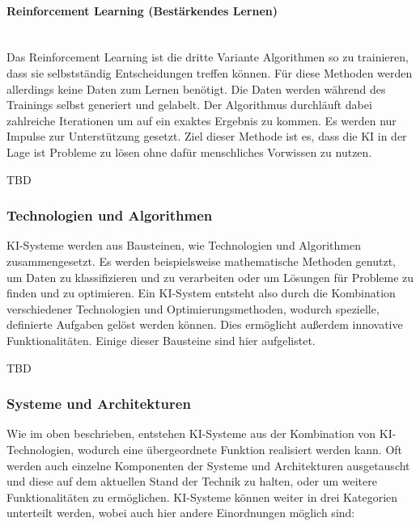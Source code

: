 \documentclass[a4paper,12pt, german]{report}
\begin{document}
\paragraph{Reinforcement Learning (Bestärkendes Lernen)} $ $ \\ Das Reinforcement Learning ist die dritte Variante Algorithmen so zu trainieren, dass sie selbstständig Entscheidungen treffen können. Für diese Methoden werden allerdings keine Daten zum Lernen benötigt. Die Daten werden während des Trainings selbst generiert und gelabelt. Der Algorithmus durchläuft dabei zahlreiche Iterationen um auf ein exaktes Ergebnis zu kommen. Es werden nur Impulse zur Unterstützung gesetzt. Ziel dieser Methode ist es, dass die KI in der Lage ist Probleme zu lösen ohne dafür menschliches Vorwissen zu nutzen.

TBD





\subsubsection{Technologien und Algorithmen}
KI-Systeme werden aus Bausteinen, wie Technologien und Algorithmen zusammengesetzt. Es werden beispielsweise mathematische Methoden genutzt, um Daten zu klassifizieren und zu verarbeiten oder um Lösungen für Probleme zu finden und zu optimieren. Ein KI-System entsteht also durch die Kombination verschiedener Technologien und Optimierungsmethoden, wodurch spezielle, definierte Aufgaben gelöst werden können. Dies ermöglicht außerdem innovative Funktionalitäten. Einige dieser Bausteine sind hier aufgelistet.

TBD

\subsubsection{Systeme und Architekturen}
Wie im oben beschrieben, entstehen KI-Systeme aus der Kombination von KI-Technologien, wodurch eine übergeordnete Funktion realisiert werden kann. Oft werden auch einzelne Komponenten der Systeme und Architekturen ausgetauscht und diese auf dem aktuellen Stand der Technik zu halten, oder um weitere Funktionalitäten zu ermöglichen. KI-Systeme können weiter in drei Kategorien unterteilt werden, wobei auch hier andere Einordnungen möglich sind:
\end{document}
